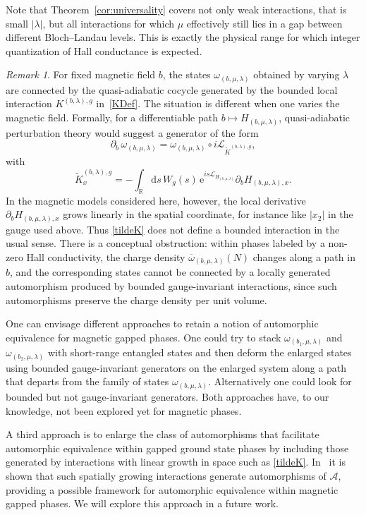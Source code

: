\documentclass[a4paper]{article}
\newcommand{\e}{\mathrm{e}}
\newcommand{\D}{\mathrm{d}}
\newcommand{\w}{\omega}
\newcommand{\mA}{\mathcal{A}}
\newcommand{\R}{\mathbb{R}}
\newcommand{\mL}{\mathcal{L}}
\theoremstyle{plain}
\theoremstyle{definition}
\theoremstyle{remark}
\newtheorem{remark}[theorem]{Remark}
\renewcommand{\(}{\left(}
\renewcommand{\)}{\right)}
\begin{document}
Note that Theorem~\ref{cor:universality} covers not only weak interactions, that is small $|\lambda|$, but all interactions 
for which $\mu $ effectively still lies in a gap between different Bloch--Landau levels. This is exactly the physical range for which integer quantization of Hall conductance is expected.



\begin{remark}\label{autoRemark}
For fixed magnetic field $b$, the states $\w_{(b,\mu,\lambda)}$ obtained by varying $\lambda$ are connected by the quasi-adiabatic cocycle generated by the bounded local interaction $K^{(b,\lambda),g}$ in~\eqref{KDef}. 
The situation is different when one varies the magnetic field. Formally, for a differentiable path $b\mapsto H_{(b,\mu,\lambda)}$, quasi-adiabatic perturbation theory would suggest a generator of the form
\[
\partial_b \,\w_{(b,\mu,\lambda)}
=
\w_{(b,\mu,\lambda)}\circ i\mL_{\widetilde K^{(b,\lambda),g}},
\]
with
\begin{equation}\label{tildeK}
\widetilde K^{(b,\lambda),g}_x
=
-\int_\R \D s\, W_g(s)\,
\e^{i s\mL_{H_{(b,\mu,\lambda)}}}
\partial_b H_{(b,\mu,\lambda),x}.
\end{equation}
In the magnetic models considered here, however, the local derivative
$\partial_b H_{(b,\mu,\lambda),x}$ grows linearly in the spatial coordinate, for instance like $|x_2|$ in the gauge used above. Thus \eqref{tildeK} does not define a bounded interaction in the usual sense.
There is a conceptual obstruction: within   phases  labeled by a non-zero Hall conductivity,  the charge density
$\overline\w_{(b,\mu,\lambda)}(N)$ changes along a path in $b$, and the corresponding states cannot be connected by a locally generated automorphism produced by bounded gauge-invariant interactions, since such automorphisms preserve the charge density per unit volume.

One can envisage different  approaches  to retain a notion of automorphic equivalence for magnetic gapped phases.
One could try  to stack $\w_{(b_1,\mu,\lambda)}$ and $\w_{ (b_2,\mu,\lambda)}$  with short-range entangled states and then deform the enlarged states using bounded gauge-invariant generators on the enlarged system along a path that departs from the family of states $\w_{(b,\mu,\lambda)}$. Alternatively one could look for bounded but not gauge-invariant generators. Both approaches have, to our knowledge, not been explored yet for magnetic phases. 

A third approach is to enlarge the class of   automorphisms  that facilitate automorphic equivalence   within  gapped ground state phases    by including  those generated by interactions with linear growth in space such as \eqref{tildeK}. In~\cite{TWW26} it is shown that such spatially growing interactions  generate automorphisms of $\mA$, providing a possible framework for automorphic equivalence within magnetic gapped phases. We will explore this approach in a future work.
\end{remark}
\end{document}

